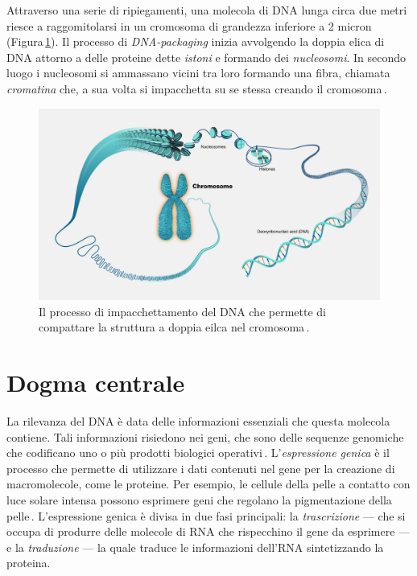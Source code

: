 Attraverso una serie di ripiegamenti, una molecola di DNA lunga circa due metri riesce a raggomitolarsi in un cromosoma di grandezza inferiore a 2 micron (Figura\,\ref{fig:dna-packaging}). Il processo di \textit{DNA-packaging} inizia avvolgendo la doppia elica di DNA attorno a delle proteine dette \textsl{istoni} e formando dei \textsl{nucleosomi}. In secondo luogo i nucleosomi si ammassano vicini tra loro formando una fibra, chiamata \textsl{cromatina} che, a sua volta si impacchetta su se stessa creando il cromosoma\,\cite{jansen2011nucleosome, zheng2010packaging}.

\begin{figure}[b!]
    \centering
    \includegraphics[width=\textwidth]{assets/dna-packaging.jpg}
    \caption[Il processo di impacchettamento del DNA.]{Il processo di impacchettamento del DNA che permette di compattare la struttura a doppia eilca nel cromosoma\,\cite{nhgri_chromosome_image}.}\label{fig:dna-packaging}
\end{figure}

\section{Dogma centrale}

La rilevanza del DNA è data delle informazioni essenziali che questa molecola contiene. Tali informazioni risiedono nei geni, che sono delle sequenze genomiche che codificano uno o più prodotti biologici operativi\,\cite{gerstein2007gene}. L'\textsl{espressione genica} è il processo che permette di utilizzare i dati contenuti nel gene per la creazione di macromolecole, come le proteine. Per esempio, le cellule della pelle a contatto con luce solare intensa possono esprimere geni che regolano la pigmentazione della pelle\,\cite{white2009gene}. L'espressione genica è divisa in due fasi principali: la \textsl{trascrizione} — che si occupa di produrre delle molecole di RNA che rispecchino il gene da esprimere — e la \textsl{traduzione} — la quale traduce le informazioni dell'RNA sintetizzando la proteina.

